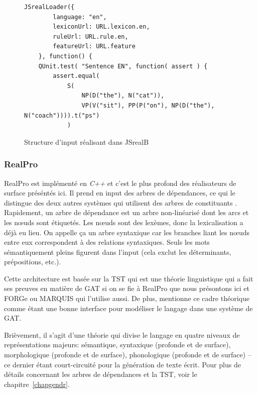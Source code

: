 \begin{figure}[htb]
\caption{Structure d'input réalisant  dans JSrealB}
\label{jsreal}
\begin{lstlisting}[language=mate]
JSrealLoader({
        language: "en",
        lexiconUrl: URL.lexicon.en,
        ruleUrl: URL.rule.en,
        featureUrl: URL.feature
    }, function() {
    QUnit.test( "Sentence EN", function( assert ) {
        assert.equal(
            S(
                NP(D("the"), N("cat")),
                VP(V("sit"), PP(P("on"), NP(D("the"), N("coach")))).t("ps")
            )
\end{lstlisting}
\end{figure}
		
\subsubsection{RealPro}
RealPro \citep{LavoieFastPortableRealizer1997} est implémenté en \emph{C++} et c'est le plus profond des réalisateurs de surface préséntés ici. Il prend en input des arbres de dépendances, ce qui le distingue des deux autres systèmes qui utilisent des arbres de constituants \citep{DBLP:conf/enlg/MolinsL15,GattSimpleNLGRealisationEngine2009}. Rapidement, un arbre de dépendance est un arbre non-linéarisé dont les arcs et les n\oe{}uds sont étiquetés. Les n\oe{}uds sont des lexèmes, donc la lexicalisation a déjà eu lieu. On appelle ça un arbre syntaxique car les branches liant les n\oe{}uds entre eux correspondent à des relations syntaxiques. Seuls les mots sémantiquement pleins figurent dans l'input (cela exclut les déterminants, prépositions, etc.).

Cette architecture est basée sur la \ac{TST} \citep{melcuk1988} qui est une théorie linguistique qui a fait ses preuves en matière de \ac{GAT} si on se fie à RealPro \citep{LavoieFastPortableRealizer1997} que nous présontons ici et FORGe \citep{MilledemoFORGePompeu2017} ou MARQUIS \citep{WannerMARQUISGENERATIONUSERTAILORED2010} qui l'utilise aussi. De plus, \cite{Vicentegeneracionlenguajenatural2015} mentionne ce cadre théorique comme étant une bonne interface pour modéliser le langage dans une système de \ac{GAT}.

Brièvement, il s'agit d'une théorie qui divise le langage en quatre niveaux de représentations majeurs: sémantique, syntaxique (profonde et de surface), morphologique (profonde et de surface), phonologique (profonde et de surface) -- ce dernier étant court-circuité pour la génération de texte écrit. Pour plus de détails concernant les arbres de dépendances et la \ac{TST}, voir le chapitre~\ref{chapgendr}.

